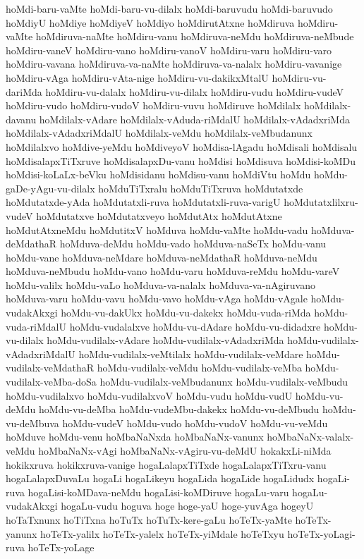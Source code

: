 {hoMdi-baru-vaMte
hoMdi-baru-vu-dilalx
hoMdi-baruvudu
hoMdi-baruvudo
hoMdiyU
hoMdiye
hoMdiyeV
hoMdiyo
hoMdirutAtxne
hoMdiruva
hoMdiru-vaMte
hoMdiruva-naMte
hoMdiru-vanu
hoMdiruva-neMdu
hoMdiruva-neMbude
hoMdiru-vaneV
hoMdiru-vano
hoMdiru-vanoV
hoMdiru-varu
hoMdiru-varo
hoMdiru-vavana
hoMdiruva-va-naMte
hoMdiruva-va-nalalx
hoMdiru-vavanige
hoMdiru-vAga
hoMdiru-vAta-nige
hoMdiru-vu-dakikxMtalU
hoMdiru-vu-dariMda
hoMdiru-vu-dalalx
hoMdiru-vu-dilalx
hoMdiru-vudu
hoMdiru-vudeV
hoMdiru-vudo
hoMdiru-vudoV
hoMdiru-vuvu
hoMdiruve
hoMdilalx
hoMdilalx-davanu
hoMdilalx-vAdare
hoMdilalx-vAduda-riMdalU
hoMdilalx-vAdadxriMda
hoMdilalx-vAdadxriMdalU
hoMdilalx-veMdu
hoMdilalx-veMbudanunx
hoMdilalxvo
hoMdive-yeMdu
hoMdiveyoV
hoMdisa-lAgadu
hoMdisali
hoMdisalu
hoMdisalapxTiTxruve
hoMdisalapxDu-vanu
hoMdisi
hoMdisuva
hoMdisi-koMDu
hoMdisi-koLaLx-beVku
hoMdisidanu
hoMdisu-vanu
hoMdiVtu
hoMdu
hoMdu-gaDe-yAgu-vu-dilalx
hoMduTiTxralu
hoMduTiTxruva
hoMdutatxde
hoMdutatxde-yAda
hoMdutatxli-ruva
hoMdutatxli-ruva-varigU
hoMdutatxlilxru-vudeV
hoMdutatxve
hoMdutatxveyo
hoMdutAtx
hoMdutAtxne
hoMdutAtxneMdu
hoMdutitxV
hoMduva
hoMdu-vaMte
hoMdu-vadu
hoMduva-deMdathaR
hoMduva-deMdu
hoMdu-vado
hoMduva-naSeTx
hoMdu-vanu
hoMdu-vane
hoMduva-neMdare
hoMduva-neMdathaR
hoMduva-neMdu
hoMduva-neMbudu
hoMdu-vano
hoMdu-varu
hoMduva-reMdu
hoMdu-vareV
hoMdu-valilx
hoMdu-vaLo
hoMduva-va-nalalx
hoMduva-va-nAgiruvano
hoMduva-varu
hoMdu-vavu
hoMdu-vavo
hoMdu-vAga
hoMdu-vAgale
hoMdu-vudakAkxgi
hoMdu-vu-dakUkx
hoMdu-vu-dakekx
hoMdu-vuda-riMda
hoMdu-vuda-riMdalU
hoMdu-vudalalxve
hoMdu-vu-dAdare
hoMdu-vu-didadxre
hoMdu-vu-dilalx
hoMdu-vudilalx-vAdare
hoMdu-vudilalx-vAdadxriMda
hoMdu-vudilalx-vAdadxriMdalU
hoMdu-vudilalx-veMtilalx
hoMdu-vudilalx-veMdare
hoMdu-vudilalx-veMdathaR
hoMdu-vudilalx-veMdu
hoMdu-vudilalx-veMba
hoMdu-vudilalx-veMba-doSa
hoMdu-vudilalx-veMbudanunx
hoMdu-vudilalx-veMbudu
hoMdu-vudilalxvo
hoMdu-vudilalxvoV
hoMdu-vudu
hoMdu-vudU
hoMdu-vu-deMdu
hoMdu-vu-deMba
hoMdu-vudeMbu-dakekx
hoMdu-vu-deMbudu
hoMdu-vu-deMbuva
hoMdu-vudeV
hoMdu-vudo
hoMdu-vudoV
hoMdu-vu-veMdu
hoMduve
hoMdu-venu
hoMbaNaNxda
hoMbaNaNx-vanunx
hoMbaNaNx-valalx-veMdu
hoMbaNaNx-vAgi
hoMbaNaNx-vAgiru-vu-deMdU
hokakxLi-niMda
hokikxruva
hokikxruva-vanige
hogaLalapxTiTxde
hogaLalapxTiTxru-vanu
hogaLalapxDuvaLu
hogaLi
hogaLikeyu
hogaLida
hogaLide
hogaLidudx
hogaLi-ruva
hogaLisi-koMDava-neMdu
hogaLisi-koMDiruve
hogaLu-varu
hogaLu-vudakAkxgi
hogaLu-vudu
hoguva
hoge
hoge-yaU
hoge-yuvAga
hogeyU
hoTaTxnunx
hoTiTxna
hoTuTx
hoTuTx-kere-gaLu
hoTeTx-yaMte
hoTeTx-yanunx
hoTeTx-yalilx
hoTeTx-yalelx
hoTeTx-yiMdale
hoTeTxyu
hoTeTx-yoLagi-ruva
hoTeTx-yoLage
}
